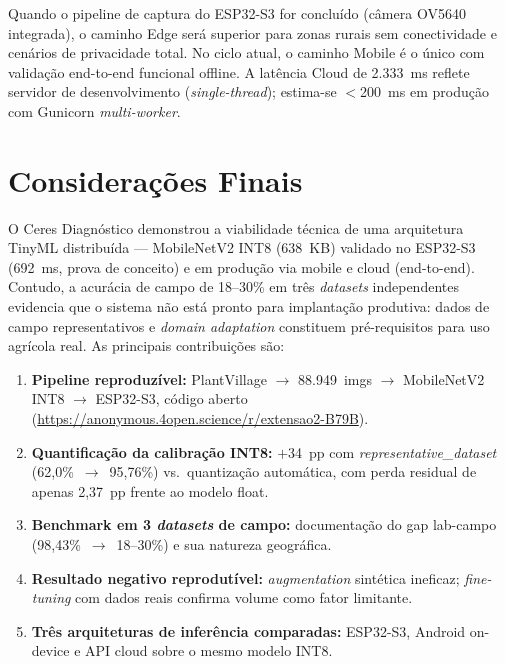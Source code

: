 \documentclass[12pt]{article}
\begin{document}
Quando o pipeline de captura do ESP32-S3 for concluído (câmera OV5640
integrada), o caminho Edge será superior para zonas rurais sem conectividade e
cenários de privacidade total. No ciclo atual, o caminho Mobile é o único com
validação end-to-end funcional offline. A latência Cloud de 2.333~ms reflete
servidor de desenvolvimento (\textit{single-thread}); estima-se $<$200~ms em
produção com Gunicorn \textit{multi-worker}.


\section{Considerações Finais}

O Ceres Diagnóstico demonstrou a viabilidade técnica de uma arquitetura TinyML
distribuída --- MobileNetV2 INT8 (638~KB) validado no ESP32-S3 (692~ms,
prova de conceito) e em produção via mobile e cloud (end-to-end). Contudo, a acurácia de campo de
18--30\% em três \textit{datasets} independentes evidencia que o sistema não está
pronto para implantação produtiva: dados de campo representativos e
\textit{domain adaptation} constituem pré-requisitos para uso agrícola real.
As principais contribuições são:

\begin{enumerate}
  \item \textbf{Pipeline reproduzível:} PlantVillage $\to$ 88.949~imgs $\to$
        MobileNetV2 INT8 $\to$ ESP32-S3, código aberto
        (\url{https://anonymous.4open.science/r/extensao2-B79B}).
  \item \textbf{Quantificação da calibração INT8:} $+$34~pp com
        \textit{representative\_dataset} (62,0\%~$\to$~95,76\%) vs.\ quantização
        automática, com perda residual de apenas 2,37~pp frente ao modelo float.
  \item \textbf{Benchmark em 3 \textit{datasets} de campo:} documentação do gap
        lab-campo (98,43\%~$\to$~18--30\%) e sua natureza geográfica.
  \item \textbf{Resultado negativo reprodutível:} \textit{augmentation} sintética
        ineficaz; \textit{fine-tuning} com dados reais confirma volume como fator
        limitante.
  \item \textbf{Três arquiteturas de inferência comparadas:} ESP32-S3, Android
        on-device e API cloud sobre o mesmo modelo INT8.
\end{enumerate}
\end{document}
